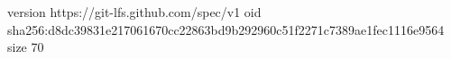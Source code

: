 version https://git-lfs.github.com/spec/v1
oid sha256:d8dc39831e217061670cc22863bd9b292960c51f2271c7389ae1fec1116e9564
size 70
